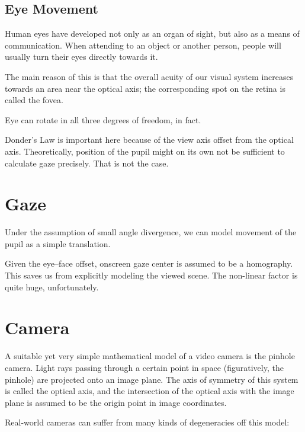 \subsection{Eye Movement}

Human eyes have developed not only as an organ of sight, but also as a means of communication.
When attending to an object or another person, people will usually turn their eyes directly towards it.

The main reason of this is that the overall acuity of our visual system increases towards an area near the optical axis; the corresponding spot on the retina is called the fovea.

Eye can rotate in all three degrees of freedom, in fact.

Donder's Law is important here because of the view axis offset from the optical axis.
Theoretically, position of the pupil might on its own not be sufficient to calculate gaze precisely.
That is not the case.

\section{Gaze}

Under the assumption of small angle divergence, we can model movement of the pupil as a simple translation.

Given the eye--face offset, onscreen gaze center is assumed to be a homography.
This saves us from explicitly modeling the viewed scene.
The non-linear factor is quite huge, unfortunately.

\section{Camera}

A suitable yet very simple mathematical model of a video camera is the pinhole camera.
Light rays passing through a certain point in space (figuratively, the pinhole) are projected onto an image plane.
The axis of symmetry of this system is called the optical axis, and the intersection of the optical axis with the image plane is assumed to be the origin point in image coordinates.

Real-world cameras can suffer from many kinds of degeneracies off this model:

